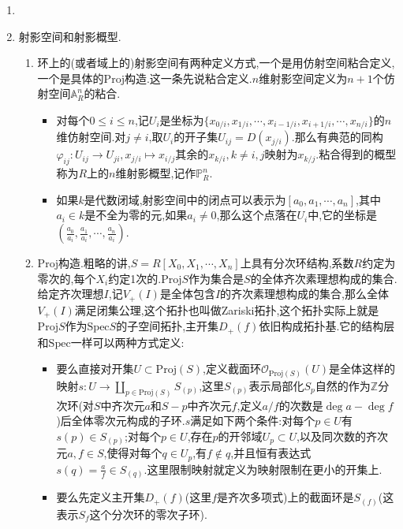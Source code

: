 \begin{enumerate}
\begin{proof}
		补充:如果$X$的子集$X_0$满足题目中的条件(即开集那个对应双射),称$X_0$是$X$的very dense子集.它有个等价描述是$X$的每个非空局部闭子集(局部闭子集是能写成一个开集和一个闭集交的集合)都和$X_0$有交.这题就是说代数闭域上的有限型仿射概型上闭点集是very dense的.如果改成代数闭域上的局部有限型概型结论也是对的,借助上面这个等价描述就可以证.(适当缩小这个非空局部闭子集可以使得它是某个仿射开子集的闭子集,但是仿射情况下闭点总存在,因为极大理想总存在,还要用到一件事是一般来讲子空间的闭点未必是原空间的闭点,但是局部有限型概型上仿射开子集的闭点肯定是原空间的闭点).取闭点子空间这个对应就是概型和簇的对应.
	\end{proof}
	\item 
	\item 射影空间和射影概型.
	\begin{enumerate}
		\item 环上的(或者域上的)射影空间有两种定义方式,一个是用仿射空间粘合定义,一个是具体的$\mathrm{Proj}$构造.这一条先说粘合定义.$n$维射影空间定义为$n+1$个仿射空间$\mathbb{A}_R^n$的粘合.
		\begin{itemize}
			\item 对每个$0\le i\le n$,记$U_i$是坐标为$\{x_{0/i},x_{1/i},\cdots,x_{i-1/i},x_{i+1/i},\cdots,x_{n/i}\}$的$n$维仿射空间.对$j\not=i$,取$U_i$的开子集$U_{ij}=D(x_{j/i})$.那么有典范的同构$\varphi_{ij}:U_{ij}\to U_{ji},x_{j/i}\mapsto x_{i/j}$其余的$x_{k/i},k\not=i,j$映射为$x_{k/j}$.粘合得到的概型称为$R$上的$n$维射影概型,记作$\mathbb{P}_R^n$.
			\item 如果$k$是代数闭域,射影空间中的闭点可以表示为$[a_0,a_1,\cdots,a_n]$,其中$a_i\in k$是不全为零的元,如果$a_i\not=0$,那么这个点落在$U_i$中,它的坐标是$\left(\frac{a_0}{a_i},\frac{a_1}{a_i},\cdots,\frac{a_n}{a_i}\right)$.
		\end{itemize}
		\item $\mathrm{Proj}$构造.粗略的讲,$S=R[X_0,X_1,\cdots,X_n]$上具有分次环结构,系数$R$约定为零次的,每个$X_i$约定1次的.$\mathrm{Proj}S$作为集合是$S$的全体齐次素理想构成的集合.给定齐次理想$I$,记$V_+(I)$是全体包含$I$的齐次素理想构成的集合,那么全体$V_+(I)$满足闭集公理,这个拓扑也叫做Zariski拓扑,这个拓扑实际上就是$\mathrm{Proj}S$作为$\mathrm{Spec}S$的子空间拓扑,主开集$D_+(f)$依旧构成拓扑基.它的结构层和$\mathrm{Spec}$一样可以两种方式定义:
		\begin{itemize}
			\item 要么直接对开集$U\subset\mathrm{Proj}(S)$,定义截面环$\mathscr{O}_{\mathrm{Proj}(S)}(U)$是全体这样的映射$s:U\to\coprod_{p\in\mathrm{Proj}(S)}S_{(p)}$,这里$S_{(p)}$表示局部化$S_p$自然的作为$\mathbb{Z}$分次环(对$S$中齐次元$a$和$S-p$中齐次元$f$,定义$a/f$的次数是$\deg a-\deg f$)后全体零次元构成的子环.$s$满足如下两个条件:对每个$p\in U$有$s(p)\in S_{(p)}$;对每个$p\in U$,存在$p$的开邻域$U_p\subset U$,以及同次数的齐次元$a,f\in S$,使得对每个$q\in U_p$,有$f\not\in q$,并且恒有表达式$s(q)=\frac{a}{f}\in S_{(q)}$.这里限制映射就定义为映射限制在更小的开集上.
			\item 要么先定义主开集$D_+(f)$(这里$f$是齐次多项式)上的截面环是$S_{(f)}$(这表示$S_f$这个分次环的零次子环).
		\end{itemize}
		

\end{enumerate}
\end{enumerate}
